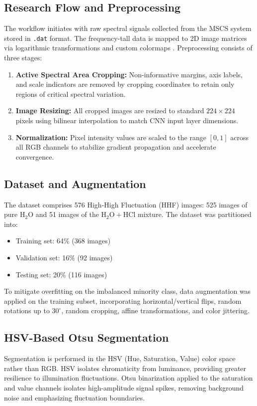 \documentclass[conference]{IEEEtran}
\begin{document}
\subsection{Research Flow and Preprocessing}
The workflow initiates with raw spectral signals collected from the MSCS system stored in \texttt{.dat} format. The frequency-tall data is mapped to 2D image matrices via logarithmic transformations and custom colormaps \cite{ref30, ref32}. 
Preprocessing consists of three stages:
\begin{enumerate}
    \item \textbf{Active Spectral Area Cropping:} Non-informative margins, axis labels, and scale indicators are removed by cropping coordinates to retain only regions of critical spectral variation.
    \item \textbf{Image Resizing:} All cropped images are resized to standard $224 \times 224$ pixels using bilinear interpolation to match CNN input layer dimensions.
    \item \textbf{Normalization:} Pixel intensity values are scaled to the range $[0, 1]$ across all RGB channels to stabilize gradient propagation and accelerate convergence.
\end{enumerate}

\subsection{Dataset and Augmentation}
The dataset comprises 576 High-High Fluctuation (HHF) images: 525 images of pure $\text{H}_2\text{O}$ and 51 images of the $\text{H}_2\text{O} + \text{HCl}$ mixture. The dataset was partitioned into:
\begin{itemize}
    \item Training set: 64\% (368 images)
    \item Validation set: 16\% (92 images)
    \item Testing set: 20\% (116 images)
\end{itemize}
To mitigate overfitting on the imbalanced minority class, data augmentation was applied on the training subset, incorporating horizontal/vertical flips, random rotations up to $30^\circ$, random cropping, affine transformations, and color jittering.

\subsection{HSV-Based Otsu Segmentation}
Segmentation is performed in the HSV (Hue, Saturation, Value) color space rather than RGB. HSV isolates chromaticity from luminance, providing greater resilience to illumination fluctuations. Otsu binarization applied to the saturation and value channels isolates high-amplitude signal spikes, removing background noise and emphasizing fluctuation boundaries.
\end{document}
